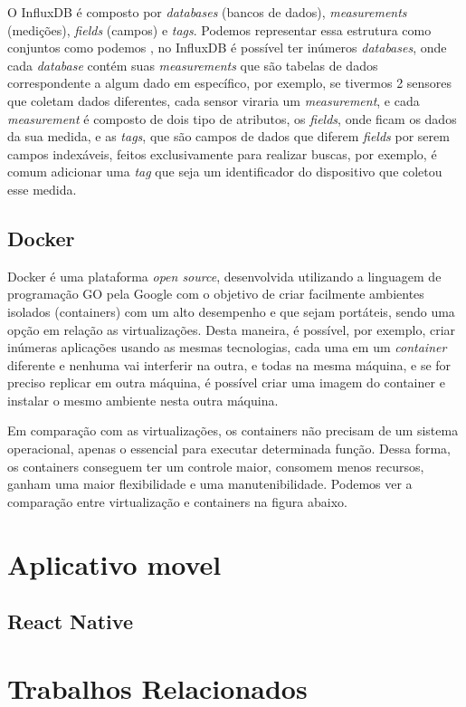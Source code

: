 O InfluxDB é composto por \textit{databases} (bancos de dados), \textit{measurements} (medições), \textit{fields} (campos) e \textit{tags}. Podemos representar essa estrutura como conjuntos como podemos , no InfluxDB é possível ter inúmeros \textit{databases}, onde cada \textit{database} contém suas \textit{measurements} que são tabelas de dados correspondente a algum dado em específico, por exemplo, se tivermos 2 sensores que coletam dados diferentes, cada sensor viraria um \textit{measurement}, e cada \textit{measurement} é composto  de dois tipo de atributos, os \textit{fields}, onde ficam os dados da sua medida, e as \textit{tags}, que são campos de dados que diferem \textit{fields} por serem campos indexáveis, feitos exclusivamente para realizar buscas, por exemplo, é comum adicionar uma \textit{tag} que seja um identificador do dispositivo que coletou esse medida.


\subsection{Docker}
\label{fund:docker}
Docker é uma plataforma \textit{open source}, desenvolvida utilizando a linguagem de programação GO pela Google com o objetivo de criar facilmente  ambientes isolados (containers) com um alto desempenho e que sejam portáteis, sendo uma opção em relação as virtualizações. Desta maneira, é possível, por exemplo, criar inúmeras aplicações usando as mesmas tecnologias, cada uma em um \textit{container} diferente e nenhuma vai interferir na outra, e todas na mesma máquina, e se for preciso replicar em outra máquina, é possível criar uma imagem do container e instalar o mesmo ambiente nesta outra máquina.

Em comparação com as virtualizações, os containers não precisam de um sistema operacional, apenas o essencial para executar determinada função. Dessa forma, os containers conseguem ter um controle maior, consomem menos recursos, ganham uma maior flexibilidade e uma manutenibilidade. Podemos ver a comparação entre virtualização e containers na figura abaixo.



\section{Aplicativo movel}
\label{fund:app}

\subsection{React Native}
\label{fund:react-native}

\section{Trabalhos Relacionados}
\label{fund:trabalhos-relacionados}

